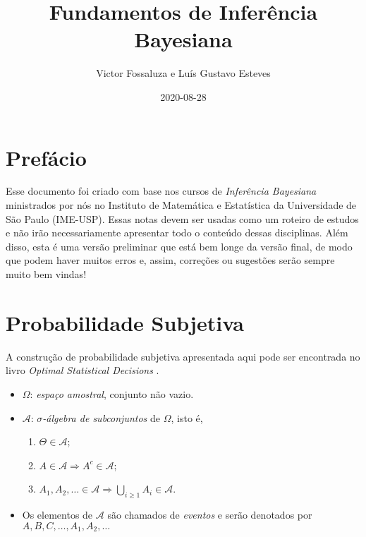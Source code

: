 \documentclass[
]{book}
\title{Fundamentos de Inferência Bayesiana}
\author{Victor Fossaluza e Luís Gustavo Esteves}
\date{2020-08-28}
\providecommand{\tightlist}{%
  \setlength{\itemsep}{0pt}\setlength{\parskip}{0pt}}
\begin{document}
\maketitle

{
\setcounter{tocdepth}{1}
\tableofcontents
}
\hypertarget{prefuxe1cio}{%
\chapter*{Prefácio}\label{prefuxe1cio}}

Esse documento foi criado com base nos cursos de \emph{Inferência Bayesiana} ministrados por nós no Instituto de Matemática e Estatística da Universidade de São Paulo (IME-USP). Essas notas devem ser usadas como um roteiro de estudos e não irão necessariamente apresentar todo o conteúdo dessas disciplinas. Além disso, esta é uma versão preliminar que está bem longe da versão final, de modo que podem haver muitos erros e, assim, correções ou sugestões serão sempre muito bem vindas!

\hypertarget{ProbSubj}{%
\chapter{Probabilidade Subjetiva}\label{ProbSubj}}

A construção de probabilidade subjetiva apresentada aqui pode ser encontrada no livro \emph{Optimal Statistical Decisions} \citep{DeGroot70}.

\begin{itemize}
\item
  \(\Omega\): \emph{espaço amostral}, conjunto não vazio.
\item
  \(\mathcal{A}\): \emph{\(\sigma\)-álgebra de subconjuntos} de \(\Omega\), isto é,

  \begin{enumerate}
  \def\labelenumi{\arabic{enumi}.}
  \tightlist
  \item
    \(\Theta \in \mathcal{A}\);
  \item
    \(A \in \mathcal{A} \Longrightarrow A^{c} \in \mathcal{A}\);
  \item
    \(\displaystyle A_1, A_2, \ldots \in \mathcal{A} \Longrightarrow \bigcup_{i\geq1} A_i \in \mathcal{A}\).
  \end{enumerate}
\item
  Os elementos de \(\mathcal{A}\) são chamados de \emph{eventos} e serão denotados por \(A, B, C, \ldots, A_1, A_2, \ldots\)
\end{itemize}
\end{document}
